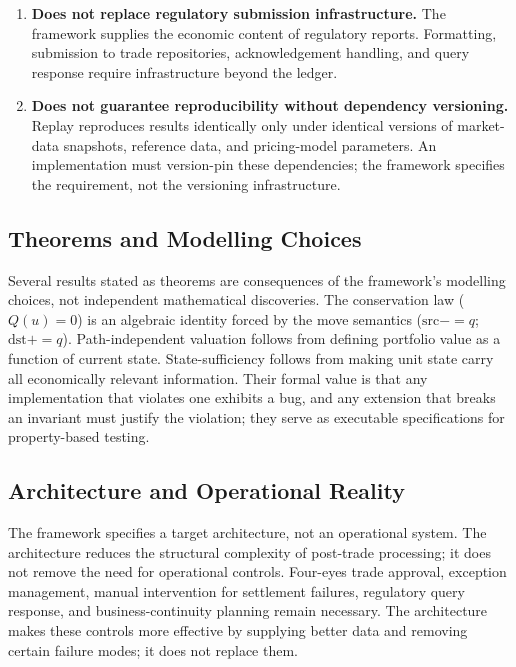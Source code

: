 \begin{enumerate}
\item \textbf{Does not replace regulatory submission infrastructure.} The framework supplies the economic content of regulatory reports. Formatting, submission to trade repositories, acknowledgement handling, and query response require infrastructure beyond the ledger.

\item \textbf{Does not guarantee reproducibility without dependency versioning.} Replay reproduces results identically only under identical versions of market-data snapshots, reference data, and pricing-model parameters. An implementation must version-pin these dependencies; the framework specifies the requirement, not the versioning infrastructure.
\end{enumerate}

\subsection{Theorems and Modelling Choices}

Several results stated as theorems are consequences of the framework's modelling choices, not independent mathematical discoveries. The conservation law ($Q(u)=0$) is an algebraic identity forced by the move semantics ($\mathrm{src}\mathbin{{-}{=}}q$; $\mathrm{dst}\mathbin{{+}{=}}q$). Path-independent valuation follows from defining portfolio value as a function of current state. State-sufficiency follows from making unit state carry all economically relevant information. Their formal value is that any implementation that violates one exhibits a bug, and any extension that breaks an invariant must justify the violation; they serve as executable specifications for property-based testing.

\subsection{Architecture and Operational Reality}

The framework specifies a target architecture, not an operational system. The architecture reduces the structural complexity of post-trade processing; it does not remove the need for operational controls. Four-eyes trade approval, exception management, manual intervention for settlement failures, regulatory query response, and business-continuity planning remain necessary. The architecture makes these controls more effective by supplying better data and removing certain failure modes; it does not replace them.

\clearpage

